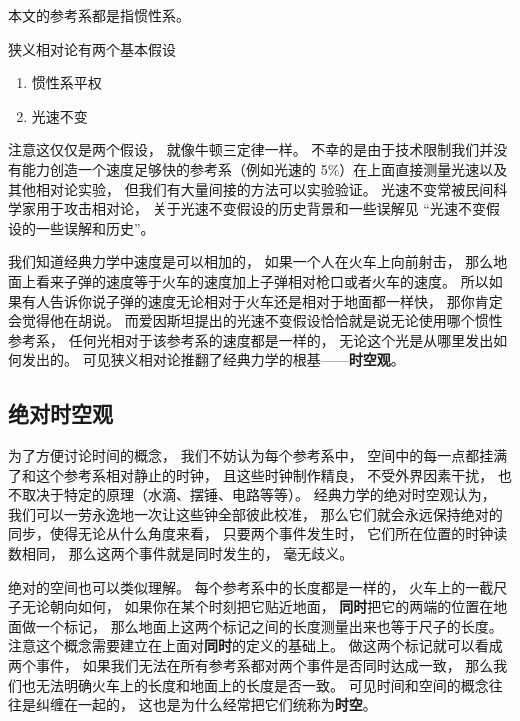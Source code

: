 
\begin{issues}
\issueDraft
\end{issues}


本文的参考系都是指惯性系。

狭义相对论有两个基本假设
\begin{enumerate}
\item 惯性系平权
\item 光速不变
\end{enumerate}

注意这仅仅是两个假设， 就像牛顿三定律一样。 不幸的是由于技术限制我们并没有能力创造一个速度足够快的参考系（例如光速的 5\%）在上面直接测量光速以及其他相对论实验， 但我们有大量间接的方法可以实验验证。 光速不变常被民间科学家用于攻击相对论， 关于光速不变假设的历史背景和一些误解见 “光速不变假设的一些误解和历史”。

我们知道经典力学中速度是可以相加的， 如果一个人在火车上向前射击， 那么地面上看来子弹的速度等于火车的速度加上子弹相对枪口或者火车的速度。 所以如果有人告诉你说子弹的速度无论相对于火车还是相对于地面都一样快， 那你肯定会觉得他在胡说。 而爱因斯坦提出的光速不变假设恰恰就是说无论使用哪个惯性参考系， 任何光相对于该参考系的速度都是一样的， 无论这个光是从哪里发出如何发出的。 可见狭义相对论推翻了经典力学的根基——\textbf{时空观}。

\subsection{绝对时空观}
为了方便讨论时间的概念， 我们不妨认为每个参考系中， 空间中的每一点都挂满了和这个参考系相对静止的时钟， 且这些时钟制作精良， 不受外界因素干扰， 也不取决于特定的原理（水滴、摆锤、电路等等）。 经典力学的绝对时空观认为， 我们可以一劳永逸地一次让这些钟全部彼此校准， 那么它们就会永远保持绝对的同步，使得无论从什么角度来看， 只要两个事件发生时， 它们所在位置的时钟读数相同， 那么这两个事件就是同时发生的， 毫无歧义。

绝对的空间也可以类似理解。 每个参考系中的长度都是一样的， 火车上的一截尺子无论朝向如何， 如果你在某个时刻把它贴近地面， \textbf{同时}把它的两端的位置在地面做一个标记， 那么地面上这两个标记之间的长度测量出来也等于尺子的长度。 注意这个概念需要建立在上面对\textbf{同时}的定义的基础上。 做这两个标记就可以看成两个事件， 如果我们无法在所有参考系都对两个事件是否同时达成一致， 那么我们也无法明确火车上的长度和地面上的长度是否一致。 可见时间和空间的概念往往是纠缠在一起的， 这也是为什么经常把它们统称为\textbf{时空}。

